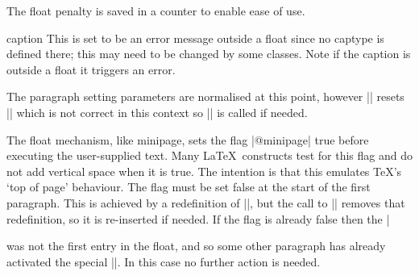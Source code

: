  \begin{macro}{\@floatpenalty}  
The float penalty is saved in a counter to enable ease of use.
 \end{macro}
    \begin{teX}
\newcount\@floatpenalty
    \end{teX}
 


\begin{docCommand}{caption}{}
    This is set to be an error message outside a float since no
    captype is defined there; this may need to be changed by some 
    classes. Note if the caption is outside a float it triggers
	an error.
\end{docCommand}

    \begin{teX}
\def\caption{%
   \ifx\@captype\@undefined
     \@latex@error{\noexpand\caption outside float}\@ehd
     \expandafter\@gobble
   \else
     \refstepcounter\@captype
     \expandafter\@firstofone
   \fi
   {\@dblarg{\@caption\@captype}}%
} 
    \end{teX}


 




 The paragraph setting parameters are normalised at this point, however
 |\@parboxrestore| resets |\everypar| which is not correct in this
 context so |\@setminipage| is called if needed.

 The float mechanism, like minipage, sets the flag |@minipage| true
 before executing the user-supplied text. Many \LaTeX\ constructs
 test for this flag and do not add vertical space when it is true.
 The intention is that this emulates \TeX's `top of page' behaviour.
 The flag must be set false at the start of the first paragraph. This
 is achieved by a redefinition of |\everypar|, but the call to
 |\@parboxrestore| removes that redefinition, so it is re-inserted 
 if needed. If the flag is already false then the |\caption| was not
 the first entry in the float, and so some other paragraph has already
 activated the special |\everypar|. In this case no further action is
 needed.
 
